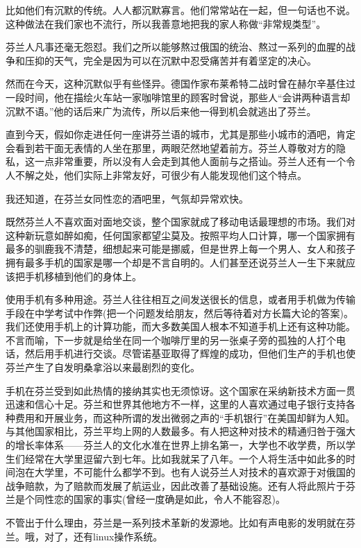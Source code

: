 比如他们有沉默的传统。人人都沉默寡言。他们常常站在一起，但一句话也不说。这种做法在我们家也不流行，所以我善意地把我的家人称做“非常规类型”。

芬兰人凡事还毫无怨怼。我们之所以能够熬过俄国的统治、熬过一系列的血腥的战争和压抑的天气，完全是因为可以在沉默中忍受痛苦并有着坚定的决心。

然而在今天，这种沉默似乎有些怪异。德国作家布莱希特二战时曾在赫尔辛基住过一段时间，他在描绘火车站一家咖啡馆里的顾客时曾说，那些人“会讲两种语言却沉默不语。”他的话后来广为流传，所以后来他一得到机会就逃出了芬兰。

直到今天，假如你走进任何一座讲芬兰语的城市，尤其是那些小城市的酒吧，肯定会看到若干面无表情的人坐在那里，两眼茫然地望着前方。芬兰人尊敬对方的隐私，这一点非常重要，所以没有人会走到其他人面前与之搭讪。芬兰人还有一个令人不解之处，他们实际上非常友好，可很少有人能发现他们这个特点。

我还知道，在芬兰女同性恋的酒吧里，气氛却异常欢快。

既然芬兰人不喜欢面对面地交谈，整个国家就成了移动电话最理想的市场。我们对这种新玩意如醉如痴，任何国家都望尘莫及。按照平均人口计算，哪一个国家拥有最多的驯鹿我不清楚，细想起来可能是挪威，但是世界上每一个男人、女人和孩子拥有最多手机的国家是哪一个却是不言自明的。人们甚至还说芬兰人一生下来就应该把手机移植到他们的身体上。

使用手机有多种用途。芬兰人往往相互之间发送很长的信息，或者用手机做为传输手段在中学考试中作弊(把一个问题发给朋友，然后等待着对方长篇大论的答案)。我们还使用手机上的计算功能，而大多数美国人根本不知道手机上还有这种功能。不言而喻，下一步就是给坐在同一个咖啡厅里的另一张桌子旁的孤独的人打个电话，然后用手机进行交谈。尽管诺基亚取得了辉煌的成功，但他们生产的手机也使芬兰产生了自发明桑拿浴以来最剧烈的变化。

手机在芬兰受到如此热情的接纳其实也无须惊讶。这个国家在采纳新技术方面一贯迅速和信心十足。芬兰和世界其他地方不一样，这里的人喜欢通过电子银行支持各种费用和开展业务，而这种所谓的发出微弱之声的“手机银行”在美国却鲜为人知。与其他国家相比，芬兰平均上网的人数最多。有人把这种对技术的精通归咎于强大的增长率体系——芬兰人的文化水准在世界上排名第一，大学也不收学费，所以学生们经常在大学里逗留六到七年。比如我就呆了八年。一个人将生活中如此多的时间泡在大学里，不可能什么都学不到。也有人说芬兰人对技术的喜欢源于对俄国的战争赔款，为了赔款而发展了航运业，因此改善了基础设施。还有人将此照片于芬兰是个同性恋的国家的事实(曾经一度确是如此，令人不能容忍)。

不管出于什么理由，芬兰是一系列技术革新的发源地。比如有声电影的发明就在芬兰。哦，对了，还有linux操作系统。

